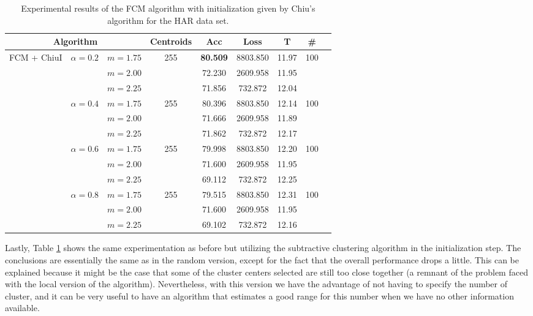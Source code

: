 \begin{table}[h!]
  \centering
\caption{Experimental results of the FCM algorithm with initialization given by Chiu's algorithm for the HAR data set.}
\label{tab:har3}
\begin{tabular}{ccccccccc}
\toprule
\multicolumn{3}{c}{Algorithm} & Centroids & Acc & Loss & T & \# \\ \midrule
\multirow{12}{*}{FCM + ChiuI} & \multirow{3}{*}{$\alpha = 0.2$} & $m=1.75$ & \multirow{3}{*}{255} & \textbf{80.509} & 8803.850 & 11.97 & \multirow{3}{*}{100}\\ \
 &  & $m=2.00$ &  & 72.230 & 2609.958 & 11.95 &\\
 &  & $m=2.25$ &  & 71.856 & 732.872 & 12.04 &\\ \cline{2-8}
 & \multirow{3}{*}{$\alpha = 0.4$} & $m=1.75$ & \multirow{3}{*}{255} & 80.396 & 8803.850 & 12.14 &\multirow{3}{*}{100}\\
 &  & $m=2.00$ &  & 71.666 & 2609.958 & 11.89 &\\
 &  & $m=2.25$ &  & 71.862 & 732.872 & 12.17 & \\ \cline{2-8}
 & \multirow{3}{*}{$\alpha = 0.6$} & $m=1.75$ & \multirow{3}{*}{255} & 79.998 & 8803.850 & 12.20 &\multirow{3}{*}{100}\\
 &  & $m=2.00$ &  & 71.600 & 2609.958 & 11.95 &\\
 &  & $m=2.25$ &  & 69.112 & 732.872 & 12.25 &\\ \cline{2-8}
 & \multirow{3}{*}{$\alpha = 0.8$} & $m=1.75$ & \multirow{3}{*}{255} & 79.515 & 8803.850 & 12.31 &\multirow{3}{*}{100}\\
 &  & $m=2.00$ &  & 71.600 & 2609.958 & 11.95 &\\
 &  & $m=2.25$ &  & 69.102 & 732.872 & 12.16 &\\ \bottomrule
\end{tabular}
\end{table}

Lastly, Table \ref{tab:har3} shows the same experimentation as before but utilizing the subtractive clustering algorithm in the initialization step. The conclusions are essentially the same as in the random version, except for the fact that the overall performance drops a little. This can be explained because it might be the case that some of the cluster centers selected are still too close together (a remnant of the problem faced with the local version of the algorithm). Nevertheless, with this version we have the advantage of not having to specify the number of cluster, and it can be very useful to have an algorithm that estimates a good range for this number when we have no other information available.

